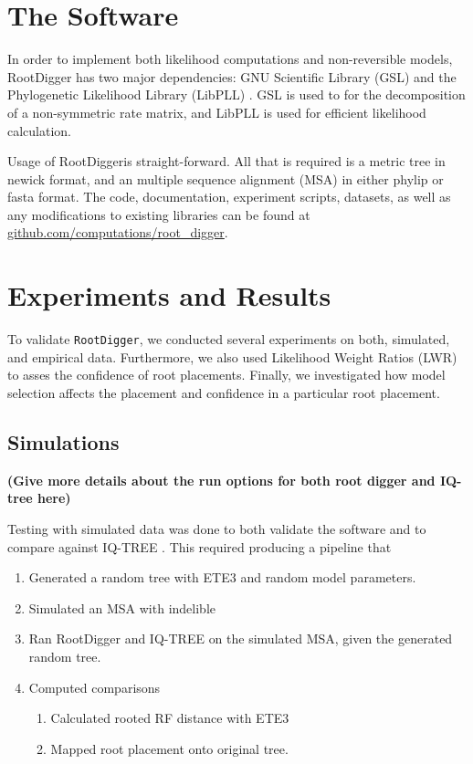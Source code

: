 \documentclass{article}
\newcommand{\RootDigger}{RootDigger}
\newcommand{\RootDiggertt}{\texttt{RootDigger}}
\newcommand{\BenComment}[1]{{\bf \color{blue} ({#1})}}
\begin{document}
\section{The Software}

In order to implement both likelihood computations and non-reversible models,
\RootDigger{} has two major dependencies: GNU Scientific Library (GSL)
\cite{gough_gnu_2009} and the Phylogenetic Likelihood Library (LibPLL)
\cite{flouri_phylogenetic_2015}.
GSL is used to for the decomposition of a non-symmetric rate matrix, and LibPLL
is used for efficient likelihood calculation.

Usage of \RootDigger is straight-forward.
All that is required is a metric tree in newick format, and an multiple
sequence alignment (MSA) in either phylip or fasta format.
The code, documentation, experiment scripts, datasets, as well as any
modifications to existing libraries can be found at
\url{github.com/computations/root_digger}.

\section{Experiments and Results}

To validate \RootDiggertt{}, we conducted several experiments on both,
simulated, and empirical data.
Furthermore, we also used Likelihood Weight Ratios (LWR)
\cite{strimmer_inferring_2002} to asses the confidence of root placements.
Finally, we investigated how model selection affects the placement and
confidence in a particular root placement.

\subsection{Simulations}

\BenComment{Give more details about the run options for both root digger and
  IQ-tree here}

Testing with simulated data was done to both validate the software and to
compare against IQ-TREE \cite{nguyen_iq-tree:_2015}.
This required producing a pipeline that

\begin{enumerate} \item Generated a random tree with ETE3
        \cite{huerta-cepas_ete_2016} and random model parameters.
  \item Simulated an MSA with indelible \cite{fletcher_indelible:_2009}
  \item Ran RootDigger and IQ-TREE \cite{nguyen_iq-tree:_2015} on the simulated
        MSA, given the generated random tree.
  \item Computed comparisons
        \begin{enumerate}
          \item Calculated rooted RF distance with ETE3
                \cite{robinson_comparison_1981}
          \item Mapped root placement onto original tree.
        \end{enumerate}
\end{enumerate}
\end{document}
